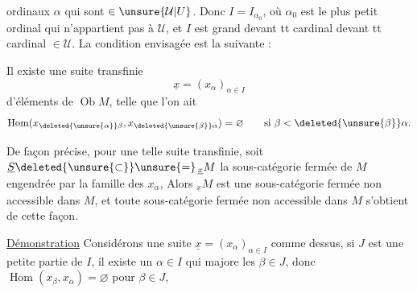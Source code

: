 ordinaux $\alpha$ \deleted{\unsure{$\in$}} qui sont $\in\unsure{\mathcal U|U}$. Donc $I=I_{\alpha_0}$, où
$\alpha_0$ est le plus petit ordinal qui n'appartient
pas à $\mathcal U$, et $I$ est grand devant tt
 cardinal   devant tt cardinal $\in\mathcal U$.
La condition envisagée est la suivante :

Il existe une suite transfinie
\[
\underline x=(x_\alpha)_{\alpha\in I}
\]
d'éléments de $\operatorname{Ob}M$, telle que l'on ait
\[
\operatorname{Hom}(x_{\deleted{\unsure{\alpha}}\beta},x_{\deleted{\unsure{\beta}}\alpha})=\varnothing\qquad\text{si }\beta<\deleted{\unsure{\beta}}\alpha.
\]

De façon précise, pour une telle suite
transfinie, soit $\underline S\deleted{\unsure{\subset}}\unsure{=}\,{}_{\underline x}M$ la sous-catégorie
fermée de  $M$ engendrée par la
famille des $x_\alpha$, 
Alors $ {}_{\underline x}M$ est une
sous-catégorie fermée non accessible dans $M$,
et toute  sous-catégorie fermée non
accessible dans $M$ s'obtient de cette
façon.

\uline{Démonstration} Considérons une suite
$\underline x=(x_\alpha)_{\alpha\in I}$ comme dessus, 
 si $J$ est une
petite partie de $I$,  il existe
un $\alpha\in I$ qui majore les $\beta\in J$,
donc $\operatorname{Hom}(x_\beta,x_\alpha)=\varnothing$ pour $\beta\in J$,
